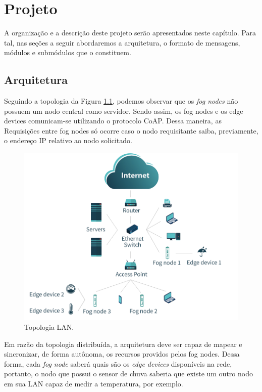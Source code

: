 \chapter{\label{chap:chap3} Projeto}



A organização e a descrição deste projeto serão apresentados neste capítulo.
Para tal, nas seções a seguir abordaremos a arquitetura, o formato de mensagens, módulos e submódulos que o constituem.

\section { Arquitetura }

Seguindo a topologia da Figura \ref{fig:fig14}, podemos observar que os \textit{fog nodes} não possuem um nodo central como servidor.
Sendo assim, os fog nodes e os edge devices comunicam-se utilizando o protocolo CoAP.
Dessa maneira, as Requisições entre fog nodes só ocorre caso o nodo requisitante saiba, previamente, o endereço IP relativo ao nodo solicitado.

\begin{figure}[H]
    \centering\includegraphics[width=.8\textwidth]{fig14.png}
    \caption [Topologia LAN]
    {\label{fig:fig14} Topologia LAN.}
\end{figure}

Em razão da topologia distribuída, a arquitetura deve ser capaz de mapear e sincronizar, de forma autônoma, os recursos providos pelos fog nodes.
Dessa forma, cada \textit{fog node} saberá quais são os \textit{edge devices} disponíveis na rede, portanto,
o nodo que possui o sensor de chuva saberia que existe um outro nodo em sua LAN capaz de medir a temperatura, por exemplo.

